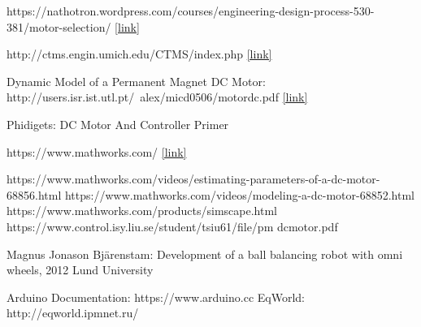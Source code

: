 \documentclass[12pt,english]{article}
\begin{document}
\begin{thebibliography}{1}
  https://nathotron.wordpress.com/courses/engineering-design-process-530-381/motor-selection/ \href{ https://nathotron.wordpress.com/courses/engineering-design-process-530-381/motor-selection/}{[link]}

  http://ctms.engin.umich.edu/CTMS/index.php \href{ http://ctms.engin.umich.edu/CTMS/index.php}{[link]}

  Dynamic Model of a Permanent Magnet DC Motor: http://users.isr.ist.utl.pt/~alex/micd0506/motordc.pdf \href{ http://users.isr.ist.utl.pt/~alex/micd0506/motordc.pdf}{[link]}

 Phidigets: DC Motor And Controller Primer

  https://www.mathworks.com/ \href{ https://www.mathworks.com/}{[link]}

 https://www.mathworks.com/videos/estimating-parameters-of-a-dc-motor-68856.html
 https://www.mathworks.com/videos/modeling-a-dc-motor-68852.html
 https://www.mathworks.com/products/simscape.html
 https://www.control.isy.liu.se/student/tsiu61/file/pm dcmotor.pdf

 Magnus Jonason Bjärenstam: Development of a ball balancing robot
with omni wheels, 2012 Lund University

 Arduino Documentation: https://www.arduino.cc
  EqWorld: http://eqworld.ipmnet.ru/


\end{thebibliography}
\end{document}
